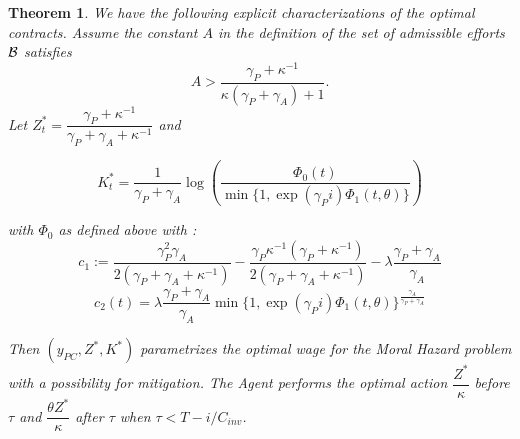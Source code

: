 \documentclass[numbook, envcountsect, envcountsame, envcountreset, runningheads, smallextended]{article}
\newtheorem{Theorem}{Theorem}[part]
\begin{document}
\begin{Theorem}
\label{theo:main2}
We have the following explicit characterizations of the optimal contracts. Assume the constant $A$ in the definition of the set of admissible efforts ${\cal B}$ satisfies 
$$
A> \dfrac{\gamma_P + \kappa^{-1}}{\kappa(\gamma_P + \gamma_A) + 1}.
$$
Let $Z^*_t  = \dfrac{\gamma_P + \kappa^{-1}}{\gamma_P + \gamma_A + \kappa^{-1}}$ and 

 $$K^*_t =\frac{1}{\gamma_P+\gamma_A}\log\left(\frac{\Phi_0(t)}{\min \Big\{1, \exp(\gamma_Pi) \Phi_1(t, \theta)\Big\}}\right)$$


with $\Phi_0$ as defined above with :
$$  c_1 := \frac{\gamma_P^2 \gamma_A}{2(\gamma_P+\gamma_A + \kappa^{-1}) } - \frac{\gamma_P \kappa^{-1} (\gamma_P+\kappa^{-1})}{2{(\gamma_P + \gamma_A + \kappa^{-1})}} - \lambda \frac{\gamma_P + \gamma_A}{\gamma_A} $$
 $$ c_2(t) = \lambda \frac{\gamma_P + \gamma_A}{\gamma_A} \min \Big\{1, \exp(\gamma_Pi) \Phi_1(t, \theta)\Big\}^{\frac{\gamma_A}{\gamma_P+\gamma_A}}$$

 
Then $(y_{PC},Z^*,K^*)$ parametrizes the optimal wage for the Moral Hazard problem with a possibility for mitigation. The Agent performs the optimal action $\dfrac{Z^*}{\kappa}$ before $\tau$ and $\dfrac{\theta Z^*}{\kappa}$ after $\tau$ 
when $\tau < T-i/C_{inv}$. 
\end{Theorem}
\end{document}
